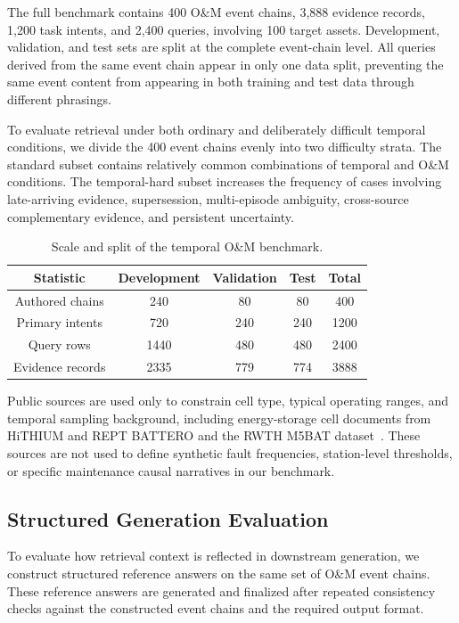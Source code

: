 The full benchmark contains 400 O\&M event chains, 3,888 evidence records, 1,200 task intents, and 2,400 queries, involving 100 target assets. Development, validation, and test sets are split at the complete event-chain level. All queries derived from the same event chain appear in only one data split, preventing the same event content from appearing in both training and test data through different phrasings.

To evaluate retrieval under both ordinary and deliberately difficult temporal conditions, we divide the 400 event chains evenly into two difficulty strata. The standard subset contains relatively common combinations of temporal and O\&M conditions. The temporal-hard subset increases the frequency of cases involving late-arriving evidence, supersession, multi-episode ambiguity, cross-source complementary evidence, and persistent uncertainty.

\begin{table}[t]
\caption{Scale and split of the temporal O\&M benchmark.}
\label{tab:dataset_stats}
\centering
\small
\begin{tabular}{ccccc}
\toprule
Statistic & Development & Validation & Test & Total \\
\midrule
Authored chains & 240 & 80 & 80 & 400 \\
Primary intents & 720 & 240 & 240 & 1200 \\
Query rows & 1440 & 480 & 480 & 2400 \\
Evidence records & 2335 & 779 & 774 & 3888 \\
\bottomrule
\end{tabular}
\end{table}

Public sources are used only to constrain cell type, typical operating ranges, and temporal sampling background, including energy-storage cell documents from HiTHIUM and REPT BATTERO and the RWTH M5BAT dataset~\cite{hithium2023v11,hithium2024v33,rept2025,rwth2026m5bat}. These sources are not used to define synthetic fault frequencies, station-level thresholds, or specific maintenance causal narratives in our benchmark.

\subsection{Structured Generation Evaluation}

To evaluate how retrieval context is reflected in downstream generation, 
we construct structured reference answers on the same set of O\&M event 
chains. These reference answers are generated and 
finalized after repeated consistency checks against the constructed event chains and the required output format.

